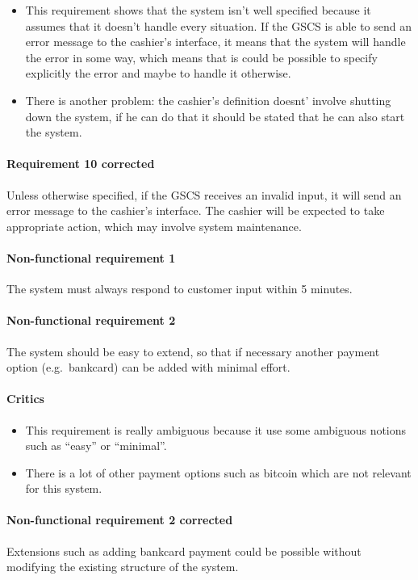 \begin{framed}
    \begin{itemize}
        \item This requirement shows that the system isn't well specified
        because it assumes that it doesn't handle every situation. If the GSCS
        is able to send an error message to the cashier's interface, it means
        that the system will handle the error in some way, which means that
        is could be possible to specify explicitly the error and maybe to
        handle it otherwise.
        \item There is another problem: the cashier's definition doesnt' involve
        shutting down the system, if he can do that it should be stated that he
        can also start the system.
    \end{itemize}

    \paragraph{Requirement 10 corrected} Unless otherwise specified, if the GSCS
    receives an invalid input, it will send an error message to the cashier's
    interface. The cashier will be expected to take appropriate action, which
    may involve system maintenance.
\end{framed}

\paragraph{Non-functional requirement 1} The system must always respond to
customer input within 5 minutes.

\paragraph{Non-functional requirement 2} The system should be easy to
extend, so that if necessary another payment option (e.g.\ bankcard) can be
added with minimal effort.

\begin{framed}
    \paragraph{Critics}
    \begin{itemize}
        \item This requirement is really ambiguous because it use some
            ambiguous notions such as \enquote{easy} or \enquote{minimal}.

        \item There is a lot of other payment options such as bitcoin
            which are not relevant for this system.
    \end{itemize}
\paragraph{Non-functional requirement 2 corrected} Extensions such as adding
bankcard payment could be possible without modifying the existing structure of
the system.
\end{framed}
